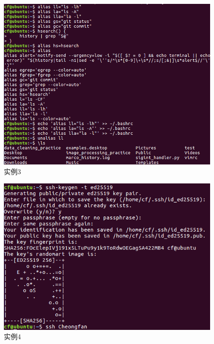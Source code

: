 \documentclass[cn,12pt]{report}
\begin{document}
{    \begin{figure}[htbp]
    \centering
    \includegraphics[width=1\textwidth]{image/3.png}
    \caption{实例3}
  \end{figure}
\FloatBarrier
   
    \begin{figure}[htbp]
    \centering
    \includegraphics[width=1\textwidth]{image/4.png}
    \caption{实例4}
  \end{figure}
\FloatBarrier
   
}
\end{document}
